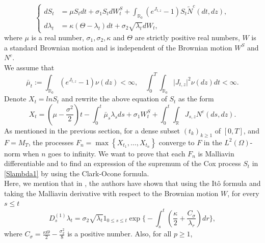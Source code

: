 \documentclass[11pt]{article}
\numberwithin{equation}{section}
\begin{document}
\begin{equation}\label{Slambda1}
\begin{cases}
dS_{t}&=\mu  S_{t}dt+\sigma_{1}S_{t}dW_{t}^S+\int_{\mathbb{R}_{0}}(e^{J_{t,z}}-1)S_{t}\tilde{N}^c(dt,dz), \\
d\lambda_{t}&=\kappa(\Theta-\lambda_{t})dt+\sigma_{2}\sqrt{\lambda_{t}}dW_{t},
\end{cases}
\end{equation}
where $\mu$ is a real number, $\sigma_1, \sigma_2, \kappa$ and $\Theta$ are strictly positive real numbers, $W$ is a standard Brownian motion and is independent of the Brownian motion $W^S$ and $N^c$. \\
We assume that $$\bar{\mu}_t := \int_{\mathbb{R}_0} (e^{J_{t,z}}-1)\nu(dz) < \infty, \quad \int_0^T \int_{\mathbb{R}_{0}} \vert J_{t,z} \vert^2 \nu(d z)dt < \infty. $$
Denote  $X_{t}= ln S_t$ and rewrite the above equation of $S_t$ as the form 
\begin{equation*}
X_{t}=(\mu -\frac{\sigma^2}{2})t-\int_0^t \bar{\mu}_s\lambda_s ds +\sigma_1 W^S_{t}+\int_{0}^{t} \int_{\mathbb{R}} J_{s,z} {N}^c(d s, d z).
\end{equation*}
As mentioned in the previous section, for a dense subset $\left(t_{k}\right)_{k \geq 1}$  of $[0, T]$, and $F=M_{T}$, the processes $F_{n}=\max \left\{X_{t_{1}}, \ldots, X_{t_{n}}\right\}$ converge to $F$ in the $L^{2}(\Omega)$-norm when $n$ goes to infinity.
We want to prove that each $F_{n}$ is Malliavin differentiable and to find an expression of the supremum of the Cox process $S_t$ in \eqref{Slambda1} by using the Clark-Ocone formula. \\
Here, we mention that in \cite{altmayer}, the authors have shown that using the It\^o formula and taking the Malliavin derivative with respect to the Brownian motion $W$,  for every $s \leq t$
\begin{equation}\label{derlamb}
D_s^{(1)}\lambda_t=\sigma_{2}\sqrt{\lambda_t}1_{0\leq s\leq t}\exp\Big\{-{\int_{s}^{t}(\frac{\kappa}{2}+\frac{C_{\sigma}}{\lambda_r})dr}\Big\},
\end{equation}
where $C_{\sigma}=\frac{\kappa\Theta}{2}-\frac{\sigma_{2}^{2}}{8}$ is a positive number. 
Also, for all $p \geq 1$,
\end{document}
